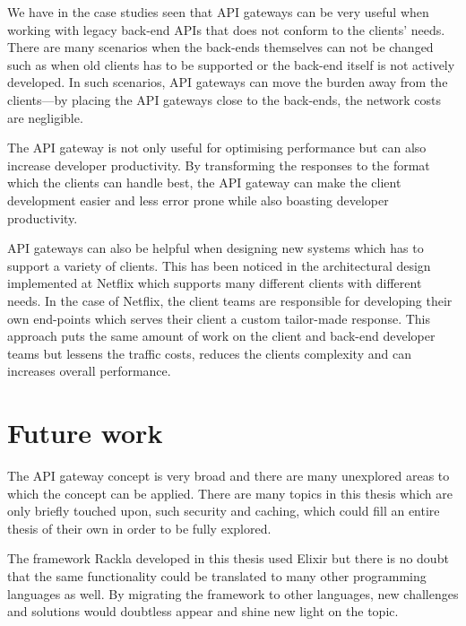 \documentclass{cslthse-msc}
\begin{document}
We have in the case studies seen that API gateways can be very useful when working with legacy back-end APIs that does not conform to the clients' needs. There are many scenarios when the back-ends themselves can not be changed such as when old clients has to be supported or the back-end itself is not actively developed. In such scenarios, API gateways can move the burden away from the clients---by placing the API gateways close to the back-ends, the network costs are negligible. 

The API gateway is not only useful for optimising performance but can also increase developer productivity. By transforming the responses to the format which the clients can handle best, the API gateway can make the client development easier and less error prone while also boasting developer productivity.

API gateways can also be helpful when designing new systems which has to support a variety of clients. This has been noticed in the architectural design implemented at Netflix\cite{netflix} which supports many different clients with different needs. In the case of Netflix, the client teams are responsible for developing their own end-points which serves their client a custom tailor-made response. This approach puts the same amount of work on the client and back-end developer teams but lessens the traffic costs, reduces the clients complexity and can increases overall performance.

\section{Future work}

The API gateway concept is very broad and there are many unexplored areas to which the concept can be applied. There are many topics in this thesis which are only briefly touched upon, such security and caching, which could fill an entire thesis of their own in order to be fully explored.

The framework Rackla developed in this thesis used Elixir but there is no doubt that the same functionality could be translated to many other programming languages as well. By migrating the framework to other languages, new challenges and solutions would doubtless appear and shine new light on the topic. 

\cleardoublepage
{}
{}


\end{document}

